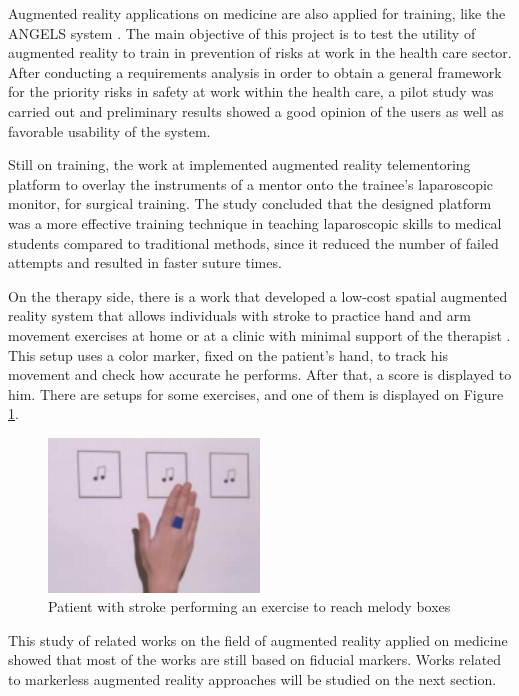 \documentclass[msc, a4paper, classic, en]{ufbathesis}
\begin{document}
Augmented reality applications on medicine are also applied for training, like the ANGELS system \cite{angels}. The main objective of this project is to test the utility of augmented reality to train in prevention of risks at work in the health care sector. After conducting a requirements analysis in order to obtain a general framework for the priority risks in safety at work within the health care, a pilot study was carried out and preliminary results showed a good opinion of the users as well as favorable usability of the system.

Still on training, the work at \cite{endo} implemented augmented reality telementoring platform to overlay the instruments of a mentor onto the trainee's laparoscopic monitor, for surgical training. The study concluded that the designed platform was a more effective training technique in teaching laparoscopic skills to medical students compared to traditional methods, since it reduced the number of failed attempts and resulted in faster suture times.

On the therapy side, there is a work that developed a low-cost spatial augmented reality system that allows individuals with stroke to practice hand and arm movement exercises at home or at a clinic with minimal support of the therapist \cite{stroke}. This setup uses a color marker, fixed on the patient's hand, to track his movement and check how accurate he performs. After that, a score is displayed to him. There are setups for some exercises, and one of them is displayed on Figure \ref{fig:stroke}.

\begin{figure}
\label{fig:stroke}
\centering
\includegraphics[width=0.5\textwidth]{images/stroke.png}
\caption{Patient with stroke performing an exercise to reach melody boxes \cite{stroke}}
\end{figure}

This study of related works on the field of augmented reality applied on medicine showed that most of the works are still based on fiducial markers. Works related to markerless augmented reality approaches will be studied on the next section.
\end{document}
